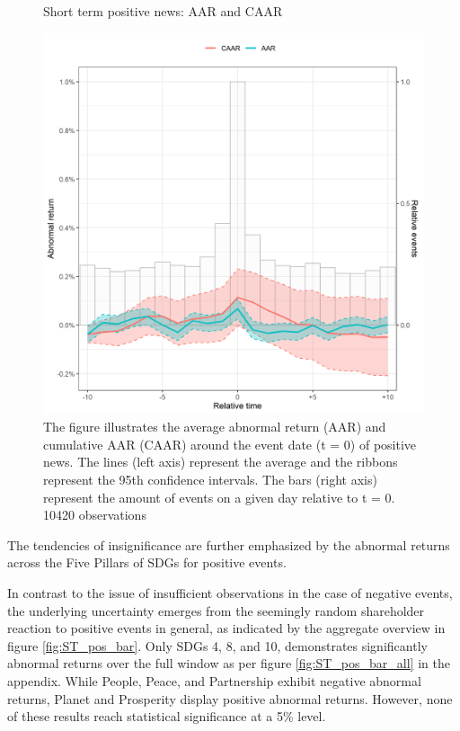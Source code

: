\begin{figure} [H] 
    \centering
    \caption{Short term positive news: AAR and CAAR}
    \includegraphics[scale=0.6]{Projekt/1.Figures analysis/ST_positive_all_CI.png}
    \caption*{\footnotesize The figure illustrates the average abnormal return (AAR) and cumulative AAR (CAAR) around the event date (t = 0) of positive news. The lines (left axis) represent the average and the ribbons represent the 95th confidence intervals. The bars (right axis) represent the amount of events on a given day relative to t = 0. 10420  observations}
    \label{fig:ST_pos_news}
\end{figure}

The tendencies of insignificance are further emphasized by the abnormal returns across the Five Pillars of SDGs for positive events. 

In contrast to the issue of insufficient observations in the case of negative events, the underlying uncertainty emerges from the seemingly random shareholder reaction to positive events in general, as indicated by the aggregate overview in figure \ref{fig:ST_pos_bar}. 
Only SDGs 4, 8, and 10, demonstrates significantly abnormal returns over the full window as per figure \ref{fig:ST_pos_bar_all} in the appendix. While People, Peace, and Partnership exhibit negative abnormal returns, Planet and Prosperity display positive abnormal returns. However, none of these results reach statistical significance at a 5\% level.   

